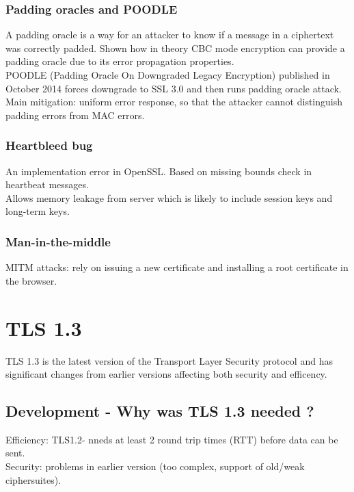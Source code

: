 \documentclass{article}
\begin{document}
\subsubsection{Padding oracles and POODLE}

A padding oracle is a way for an attacker to know if a message in a ciphertext was correctly padded. Shown how in theory CBC mode encryption can provide a padding oracle due to its error propagation properties.\\
POODLE (Padding Oracle On Downgraded Legacy Encryption) published in October 2014 forces downgrade to SSL 3.0 and then runs padding oracle attack.\\
Main mitigation: uniform error response, so that the attacker cannot distinguish padding errors from MAC errors.

\subsubsection{Heartbleed bug}

An implementation error in OpenSSL. Based on missing bounds check in heartbeat messages.\\
Allows memory leakage from server which is likely to include session keys and long-term keys.

\subsubsection{Man-in-the-middle}

MITM attacks: rely on issuing a new certificate and installing a root certificate in the browser.

\newpage
\section{TLS 1.3}\label{TLS1.3}

TLS 1.3 is the latest version of the Transport Layer Security protocol and has significant changes from earlier versions affecting both security and efficency.

\subsection{Development - Why was TLS 1.3 needed ?}

Efficiency: TLS1.2- nneds at least 2 round trip times (RTT) before data can be sent.\\
Security: problems in earlier version (too complex, support of old/weak ciphersuites).
\end{document}
